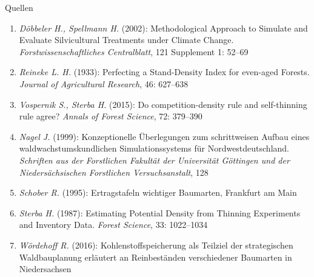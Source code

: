 \begin{frame}[plain]
\begin{center}
    \begin{minipage}{0.73\textwidth}  %
      \begin{block}{Quellen}
        \begin{tiny}
          \begin{enumerate}
          \item \emph{Döbbeler H., Spellmann H.} (2002): Methodological Approach to Simulate and Evaluate Silvicultural Treatments under Climate Change. \emph{Forstwissenschaftliches Centralblatt}, 121 Supplement 1: 52--69  %
          \item \emph{Reineke L. H.} (1933): Perfecting a Stand-Density Index for even-aged Forests. \emph{Journal of Agricultural Research}, 46: 627--638
          \item \emph{Vospernik S., Sterba H.} (2015): Do competition-density rule and self-thinning rule agree? \emph{Annals of Forest Science}, 72: 379--390
          \item \emph{Nagel J.} (1999): Konzeptionelle Überlegungen zum schrittweisen Aufbau eines waldwachstumskundlichen Simulationssystems für Nordwestdeutschland. \emph{Schriften aus der Forstlichen Fakultät der Universität Göttingen und der Niedersächsischen Forstlichen Versuchsanstalt}, 128
          \item \emph{Schober R.} (1995): Ertragstafeln wichtiger Baumarten, Frankfurt am Main
          \item \emph{Sterba H.} (1987): Estimating Potential Density from Thinning Experiments and Inventory Data. \emph{Forest Science}, 33: 1022--1034
          \item \emph{Wördehoff R.} (2016): Kohlenstoffspeicherung als Teilziel der strategischen Waldbauplanung erläutert an Reinbeständen verschiedener Baumarten in Niedersachsen
          \end{enumerate}
        \end{tiny}
      \end{block}
    \end{minipage}
  \end{center}
\end{frame}

